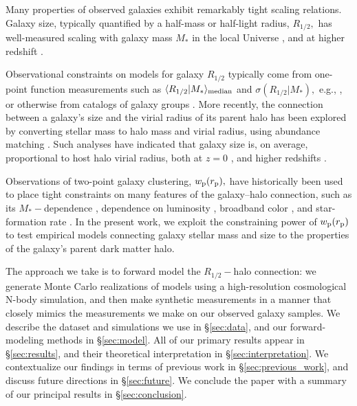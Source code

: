 \documentclass[usenatbib,usegraphicx,letterpaper]{mn2e}
\newcommand{\rhalf}{R_{1/2}}
\newcommand{\mstar}{M_{\ast}}
\newcommand{\rproj}{r_{\rm p}}
\newcommand{\wproj}{w_{\rm p}}
\newcommand{\median}[2]{\langle{#1}\vert{#2}\rangle_{\rm median}}
\begin{document}
Many properties of observed galaxies exhibit remarkably tight scaling relations. Galaxy size, typically quantified by a half-mass or half-light radius, $\rhalf,$ has well-measured scaling with galaxy mass $\mstar$ in the local Universe \citep{shen_etal03,huang_etal13,lange_etal15,zhang_yang17}, and at higher redshift \citep{trujillo_etal04,vanderwel_etal14,kawamata_etal15,shibuya_etal15,huertas_company_etal13a,huang_etal17}.

Observational constraints on models for galaxy $\rhalf$ typically come from one-point function measurements such as $\median{\rhalf}{\mstar}$ and $\sigma(\rhalf\vert\mstar),$ e.g.,  \citet{khochfar_silk06,lang_etal14,desmond_etal17,bottrell_etal17b,hou_etal17,somerville_etal17}, or otherwise from catalogs of galaxy groups \citep{weinmann_etal08,guo_etal09,huertas_company_etal13b,spindler_wake17}. More recently, the connection between a galaxy's size and the virial radius of its parent halo has been
explored by converting stellar mass to halo mass and virial radius, using abundance matching \citep{kravtsov_etal04,tasitsiomi_etal04,vale_ostriker04,vale_ostriker06,conroy_etal06}.  Such analyses have indicated that galaxy size is, on average, proportional to host halo virial radius, both at $z=0$ \citep{kravtsov13}, and higher redshifts \citep{huang_etal17,somerville_etal17}.

Observations of two-point galaxy clustering, $\wproj(\rproj),$ have historically been used to place tight constraints on many features of the galaxy--halo connection, such as its $\mstar-$dependence \citep{moster_etal10,leauthaud_etal11,reddick_etal13,skibba_etal15}, dependence on luminosity \citep{kravtsov_etal04, tasitsiomi_etal04,vale_ostriker04,vale_ostriker06,tinker_etal05,cacciato_etal13}, broadband color \citep{coil_etal08,zehavi_etal11,guo_etal11,hearin_watson13}, and star-formation rate \citep{wang_etal07,tinker_etal13,watson_etal14}. In the present work, we exploit the constraining power of $\wproj(\rproj)$ to test empirical models connecting galaxy stellar mass and size to the properties of the galaxy's parent dark matter halo.

The approach we take is to forward model the $\rhalf-$halo connection: we generate Monte Carlo realizations of models using a high-resolution cosmological N-body simulation, and then make synthetic measurements in a manner that closely mimics the measurements we make on our observed galaxy samples. We describe the dataset and simulations we use in \S\ref{sec:data}, and our forward-modeling methods in \S\ref{sec:model}. All of our primary results appear in \S\ref{sec:results}, and their theoretical interpretation in \S\ref{sec:interpretation}. We contextualize our findings in terms of previous work in \S\ref{sec:previous_work}, and discuss future directions in \S\ref{sec:future}. We conclude the paper with a summary of our principal results in \S\ref{sec:conclusion}.
\end{document}
